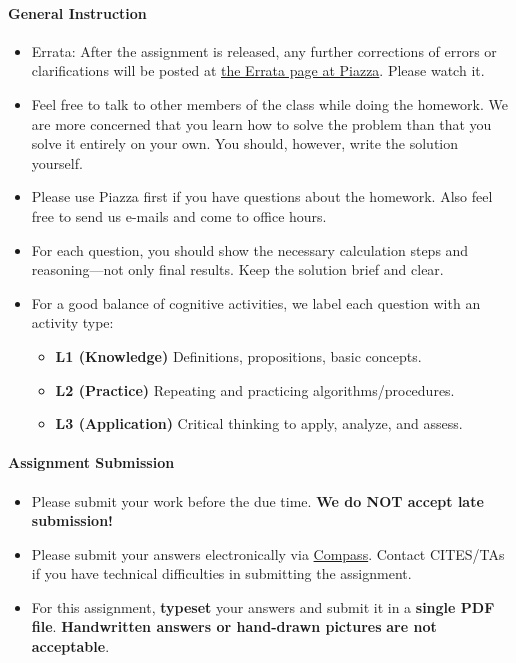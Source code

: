\paragraph*{General Instruction}
\begin{itemize}\vspace{-2mm}\setlength\itemsep{0mm}
	\item Errata: After the assignment is released, any further corrections of errors or clarifications will be posted at \href{https://piazza.com/class/idqujg4tiae3q0?cid=93}{the Errata page at Piazza}. Please watch it.
	\item Feel free to talk to other members of the class while doing the homework. We are more concerned that
	you learn how to solve the problem than that you solve it entirely on your own. You should, however, write the solution yourself. 
	\item Please use                            Piazza first if you have questions about the homework. Also feel free to send us e-mails and come to office hours. 
	\item For each question, you should show the necessary calculation steps and reasoning---not only final results. Keep the solution brief and clear.
	\item For a good balance of cognitive activities, we label each question with an activity type:
	\begin{itemize}
		\item {\bf L1 (Knowledge)} Definitions, propositions, basic concepts.
		\item {\bf L2 (Practice)} Repeating and practicing algorithms/procedures.
		\item {\bf L3 (Application)} Critical thinking to apply, analyze, and assess.
	\end{itemize}
\end{itemize}
\paragraph*{Assignment Submission}
\begin{itemize}\vspace{-2mm}\setlength\itemsep{0mm}
	\setlength{\itemsep}{2pt}
	\item Please submit your work before the due time. \textbf{We do NOT accept late submission!}
	\item 
	Please submit your answers electronically via  \href{http://compass2g.illinois.edu}{Compass}. Contact CITES/TAs if you have technical difficulties in submitting the assignment.
	\item For this assignment, {\bf typeset} your answers and submit it in a {\bf single PDF file}. \textbf{Handwritten answers or hand-drawn pictures} \textbf{are not acceptable}.
\end{itemize}

